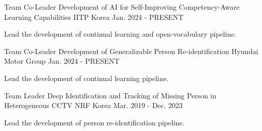 

\begin{cventries}

  \cventry
    {Team Co-Leader} %
    {Development of AI for Self-Improving Competency-Aware Learning Capabilities} %
    {IITP Korea} %
    {Jan. 2024 - PRESENT} %
    {
      \begin{cvitems} %
        \item {Lead the development of continual learning and open-vocabulary pipeline.}
      \end{cvitems}
    }

  \cventry
    {Team Co-Leader} %
    {Development of Generalizable Person Re-identification} %
    {Hyundai Motor Group} %
    {Jan. 2024 - PRESENT} %
    {
      \begin{cvitems} %
        \item {Lead the development of continual learning pipeline.}
      \end{cvitems}
    }

  \cventry
    {Team Leader} %
    {Deep Identification and Tracking of Missing Person in Heterogeneous CCTV} %
    {NRF Korea} %
    {Mar. 2019 - Dec. 2023} %
    {
      \begin{cvitems} %
        \item {Lead the development of person re-identification pipeline.}
      \end{cvitems}
    }


\end{cventries}
